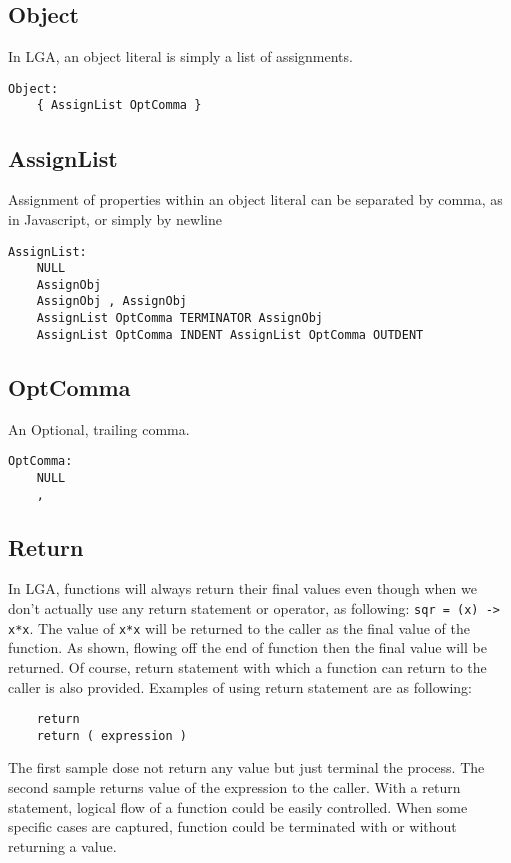 \documentclass[10pt]{report}
\begin{document}
\subsection{Object}

In LGA, an object literal is simply a list of assignments.
\begin{verbatim}
Object:
    { AssignList OptComma }
\end{verbatim}


\subsection{AssignList}

Assignment of properties within an object literal can be separated by comma, as in Javascript, or simply by newline
\begin{verbatim}
AssignList:
    NULL
    AssignObj
    AssignObj , AssignObj
    AssignList OptComma TERMINATOR AssignObj
    AssignList OptComma INDENT AssignList OptComma OUTDENT
\end{verbatim}


\subsection{OptComma}
An Optional, trailing comma.
\begin{verbatim}
OptComma:
    NULL
    ,
\end{verbatim}

\subsection{Return}

In LGA, functions will always return their final values even though when we don’t actually use any return statement or operator, as following: \texttt{sqr = (x) -> x*x}. The value of \texttt{x*x} will be returned to the caller as the final value of the function. As shown, flowing off the end of function then the final value will be returned.
Of course, return statement with which a function can return to the caller is also provided. Examples of using return statement are as following:
\begin{verbatim}
	return
	return ( expression )
\end{verbatim}

The first sample dose not return any value but just terminal the process. The second sample returns value of the expression to the caller. With a return statement, logical flow of a function could be easily controlled. When some specific cases are captured, function could be terminated with or without returning a value.
\end{document}
